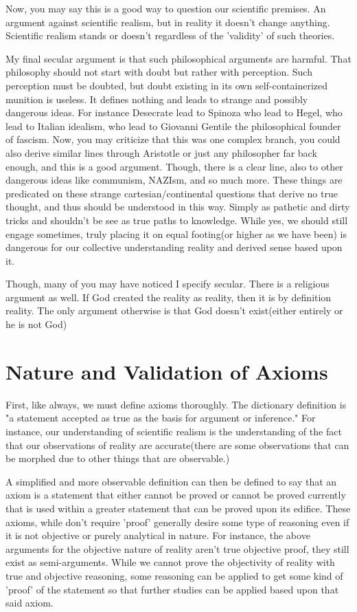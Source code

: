 \par Now, you may say this is a good way to question our scientific premises. An argument against scientific realism, but in reality it doesn't change anything. Scientific realism stands or doesn't regardless of the 'validity' of such theories.
\par My final secular argument is that such philosophical arguments are harmful. That philosophy should not start with doubt but rather with perception. Such perception must be doubted, but doubt existing in its own self-containerized munition is useless. It defines nothing and leads to strange and possibly dangerous ideas. For instance Desecrate lead to Spinoza who lead to Hegel, who lead to Italian idealism, who lead to Giovanni Gentile the philosophical founder of fascism. Now, you may criticize that this was one complex branch, you could also derive similar lines through Aristotle or just any philosopher far back enough, and this is a good argument. Though, there is a clear line, also to other dangerous ideas like communism, NAZIsm, and so much more. These things are predicated on these strange cartesian/continental questions that derive no true thought, and thus should be understood in this way. Simply as pathetic and dirty tricks and shouldn't be see as true paths to knowledge. While yes, we should still engage sometimes, truly placing it on equal footing(or higher as we have been) is dangerous for our collective understanding reality and derived sense based upon it.
\par Though, many of you may have noticed I specify secular. There is a religious argument as well. If God created the reality as reality, then it is by definition reality. The only argument otherwise is that God doesn't exist(either entirely or he is not God)

\section{Nature and Validation of Axioms}
\par First, like always, we must define axioms thoroughly. The dictionary definition is "a statement accepted as true as the basis for argument or inference." For instance, our understanding of scientific realism is the understanding of the fact that our observations of reality are accurate(there are some observations that can be morphed due to other things that are observable.)
\par A simplified and more observable definition can then be defined to say that an axiom is a statement that either cannot be proved or cannot be proved currently that is used within a greater statement that can be proved upon its edifice. These axioms, while don't require 'proof' generally desire some type of reasoning even if it is not objective or purely analytical in nature. For instance, the above arguments for the objective nature of reality aren't true objective proof, they still exist as semi-arguments. While we cannot prove the objectivity of reality with true and objective reasoning, some reasoning can be applied to get some kind of 'proof' of the statement so that further studies can be applied based upon that said axiom.
